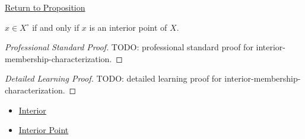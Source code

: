 \newpage
{}
\label{prf:interior-membership-characterization}

\begin{remark*}[Return]
\hyperref[prop:interior-membership-characterization]{Return to Proposition}
\end{remark*}

\begin{proposition*}
\(x\in X^\circ\) if and only if \(x\) is an interior point of \(X\).
\end{proposition*}

\begin{proof}[Professional Standard Proof]
\LRAProofBodyStart
TODO: professional standard proof for interior-membership-characterization.
\end{proof}

\begin{proof}[Detailed Learning Proof]
\LRAProofBodyStart
TODO: detailed learning proof for interior-membership-characterization.
\end{proof}

\begin{remark*}
\end{remark*}

\begin{dependencies}
\begin{itemize}
  \item \hyperref[def:interior-r]{Interior}
  \item \hyperref[def:interior-point-r]{Interior Point}
\end{itemize}
\end{dependencies}

\clearpage
